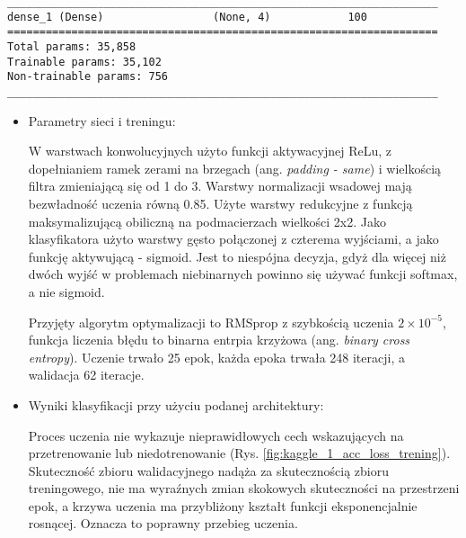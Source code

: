 {\newsavebox\myvvvvv
\begin{lrbox}{\myvvvvv}
\setlength{\myminipagewidth}{0.9\linewidth} %
\setlength{\myminipagecentering}{(\linewidth-\myminipagewidth)/2}
\noindent\hspace{\myminipagecentering}\begin{minipage}{\myminipagewidth}
\begin{verbatim}
___________________________________________________________________
dense_1 (Dense)                 (None, 4)            100    
===================================================================
Total params: 35,858
Trainable params: 35,102
Non-trainable params: 756
___________________________________________________________________
\end{verbatim} 
\end{minipage}\end{lrbox}
\resizebox{0.75\textwidth}{!}{\usebox\myvvvvv}

\begin{itemize}
\item Parametry sieci i treningu:

W warstwach konwolucyjnych użyto funkcji aktywacyjnej ReLu, z dopełnianiem ramek zerami na brzegach (ang. \textit{padding - same}) i wielkością filtra zmieniającą się od 1 do 3. Warstwy normalizacji wsadowej mają bezwładność uczenia równą 0.85. Użyte warstwy redukcyjne z funkcją maksymalizującą obiliczną na podmacierzach wielkości 2x2. Jako klasyfikatora użyto warstwy gęsto połączonej z czterema wyjściami, a jako funkcję aktywującą - sigmoid. Jest to niespójna decyzja, gdyż dla więcej niż dwóch wyjść w problemach niebinarnych powinno się używać funkcji softmax, a nie sigmoid.

Przyjęty algorytm optymalizacji to RMSprop z szybkością uczenia \(2 \times 10^{-5}\), funkcja liczenia błędu to binarna entrpia krzyżowa (ang. \textit{binary cross entropy}). Uczenie trwało 25 epok, każda epoka trwała 248 iteracji, a walidacja 62 iteracje.

\item Wyniki klasyfikacji przy użyciu podanej architektury:

Proces uczenia nie wykazuje nieprawidłowych cech wskazujących na przetrenowanie lub niedotrenowanie (Rys. \ref{fig:kaggle_1_acc_loss_trening}). Skuteczność zbioru walidacyjnego nadąża za skutecznością zbioru treningowego, nie ma wyraźnych zmian skokowych skuteczności na przestrzeni epok, a krzywa uczenia ma przybliżony kształt funkcji eksponencjalnie rosnącej. Oznacza to poprawny przebieg uczenia.


\end{itemize}}
